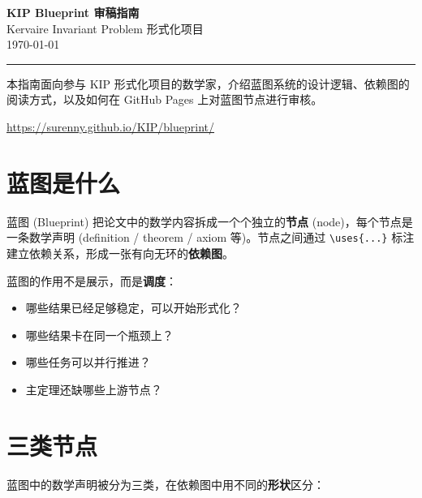 \documentclass[11pt,a4paper]{article}
\begin{document}
\begin{center}
{\Huge\bfseries\sffamily\color{accentblue} KIP Blueprint 审稿指南}\\[12pt]
{\large\color{gray} Kervaire Invariant Problem 形式化项目}\\[6pt]
{\normalsize\color{gray} \today}
\end{center}

\vspace{8pt}
\noindent\rule{\textwidth}{0.8pt}
\vspace{4pt}

本指南面向参与 KIP 形式化项目的数学家，介绍蓝图系统的设计逻辑、依赖图的阅读方式，以及如何在 GitHub Pages 上对蓝图节点进行审核。

\begin{infobox}[蓝图地址]
\url{https://surenny.github.io/KIP/blueprint/}
\end{infobox}

\tableofcontents

\newpage

\section{蓝图是什么}

蓝图 (Blueprint) 把论文中的数学内容拆成一个个独立的\textbf{节点} (node)，每个节点是一条数学声明 (definition / theorem / axiom 等)。节点之间通过 \verb|\uses{...}| 标注建立依赖关系，形成一张有向无环的\textbf{依赖图}。

蓝图的作用不是展示，而是\textbf{调度}：

\begin{itemize}[nosep]
  \item 哪些结果已经足够稳定，可以开始形式化？
  \item 哪些结果卡在同一个瓶颈上？
  \item 哪些任务可以并行推进？
  \item 主定理还缺哪些上游节点？
\end{itemize}

\section{三类节点}

蓝图中的数学声明被分为三类，在依赖图中用不同的\textbf{形状}区分：
\end{document}
